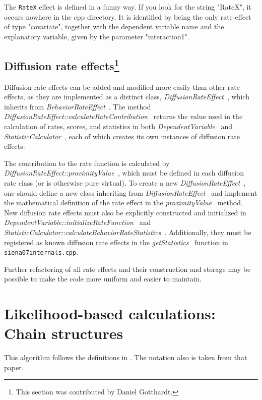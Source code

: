 \documentclass[a4paper,12pt,fleqn]{article}
\newcommand{\nnm}[1]{\textsf{\small\textit{#1}\ }}
\begin{document}
The \texttt{RateX} effect is defined in a funny way.
If you look for the string "RateX", it occurs nowhere in the cpp directory.
It is identified by being the only rate effect of type "covariate",
together with the dependent variable name and the explanatory variable,
given by the parameter "interaction1".

\subsection{Diffusion rate effects\protect\footnote{This
    section was contributed by Daniel Gotthardt.}}

Diffusion rate effects can be added and modified more easily than other rate
effects, as they are implemented as a distinct class, \nnm{DiffusionRateEffect},
which inherits from \nnm{BehaviorRateEffect}. The method
\nnm{DiffusionRateEffect::calculateRateContribution} returns the value used in
the calculation of rates, scores, and statistics in both \nnm{DependentVariable}
and \nnm{StatisticCalculator}, each of which creates its own instances of
diffusion rate effects.

The contribution to the rate function is calculated by\\
\nnm{DiffusionRateEffect::proximityValue}, which must be defined in each
diffusion rate class (or is otherwise pure virtual). To create a new
\nnm{DiffusionRateEffect}, one should define a new class inheriting from
\nnm{DiffusionRateEffect} and implement the mathematical definition of the
rate effect in the \nnm{proximityValue} method. New diffusion rate effects
must also be explicitly constructed and initialized in
\nnm{DependentVariable::initializeRateFunction} and
\nnm{StatisticCalculator::calculateBehaviorRateStatistics}. Additionally,
they must be registered as known diffusion rate effects in the \nnm{getStatistics}
function in \texttt{siena07internals.cpp}.

Further refactoring of all rate effects and their construction and storage may
be possible to make the code more uniform and easier to maintain.


\newpage
\section{Likelihood-based calculations:
         \protect\newline Chain structures}

This algorithm follows the definitions in
\citet{SnijdersEA10a}.
The notation also is taken from that paper.
\end{document}

